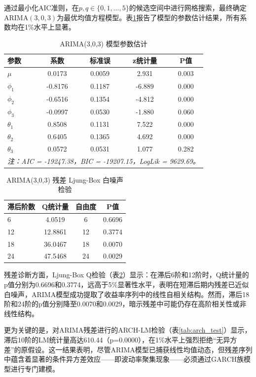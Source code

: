 \documentclass[12pt,a4paper]{ctexart}
\begin{document}
通过最小化AIC准则，在$p,q \in \{0,1,\ldots,5\}$的候选空间中进行网格搜索，最终确定ARIMA$(3,0,3)$为最优均值方程模型。表\ref{tab:arima_coef}报告了模型的参数估计结果，所有系数均在1\%水平上显著。

\begin{table}[htbp]
  \centering
  \caption{ARIMA(3,0,3) 模型参数估计}
  \label{tab:arima_coef}
  \begin{tabular}{lcccc}
    \toprule
    参数 & 系数 & 标准误 & z统计量 & P值 \\
    \midrule
    $\mu$ & 0.0173 & 0.0059 & 2.931 & 0.003 \\
    $\phi_1$ & -0.8176 & 0.1187 & -6.889 & 0.000 \\
    $\phi_2$ & -0.6516 & 0.1354 & -4.812 & 0.000 \\
    $\phi_3$ & -0.0997 & 0.0530 & -1.880 & 0.060 \\
    $\theta_1$ & 0.8508 & 0.1131 & 7.522 & 0.000 \\
    $\theta_2$ & 0.6405 & 0.1365 & 4.692 & 0.000 \\
    $\theta_3$ & 0.0572 & 0.0531 & 1.077 & 0.282 \\
    \bottomrule
    \multicolumn{5}{l}{\textit{注：AIC = -19247.38，BIC = -19207.15，LogLik = 9629.69。}}
  \end{tabular}
\end{table}

\begin{table}[htbp]
  \centering
  \caption{ARIMA(3,0,3) 残差 Ljung-Box 白噪声检验}
  \label{tab:arima_resid}
  \begin{tabular}{lccc}
    \toprule
    滞后阶数 & Q统计量 & 自由度 & P值 \\
    \midrule
    6 & 4.0519 & 6 & 0.6696 \\
    12 & 12.8861 & 12 & 0.3774 \\
    18 & 36.0467 & 18 & 0.0070 \\
    24 & 47.5468 & 24 & 0.0029 \\
    \bottomrule
  \end{tabular}
\end{table}

残差诊断方面，Ljung-Box Q检验（表\ref{tab:arima_resid}）显示：在滞后6阶和12阶时，Q统计量的p值分别为0.6696和0.3774，远高于5\%显著性水平，表明在短滞后期内残差已近似白噪声，ARIMA模型成功提取了收益率序列中的线性自相关结构。然而，滞后18阶和24阶的p值分别降至0.0070和0.0029，暗示残差中可能仍存在高阶相关性或非线性结构。

更为关键的是，对ARIMA残差进行的ARCH-LM检验（表\ref{tab:arch_test}）显示，滞后10阶的LM统计量高达610.44（p=0.0000），在1\%水平上强烈拒绝“无异方差”的原假设。这一结果表明，尽管ARIMA模型已捕获线性均值动态，但残差序列中蕴含着显著的条件异方差效应——即波动率聚集现象——必须通过GARCH族模型进行专门建模。
\end{document}
